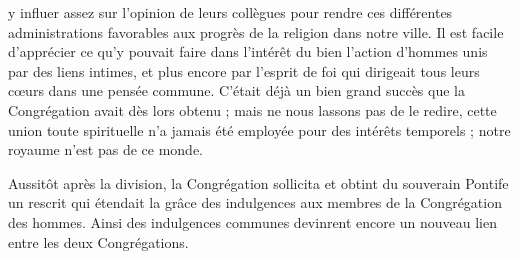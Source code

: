 y influer assez sur l'opinion de leurs collègues pour rendre ces différentes administrations favorables aux progrès de la religion dans notre ville. Il est facile d'apprécier ce qu'y pouvait faire dans l'intérêt du bien l'action d'hommes unis par des liens intimes, et plus encore par l'esprit de foi qui dirigeait tous leurs cœurs dans une pensée commune. C'était déjà un bien grand succès que la Congrégation avait dès lors obtenu ; mais ne nous lassons pas de le redire, cette union toute spirituelle n'a jamais été employée pour des intérêts temporels ; notre royaume n'est pas de ce monde.

Aussitôt après la division, la Congrégation sollicita et obtint du souverain Pontife un rescrit qui étendait la grâce des indulgences aux membres de la Congrégation des hommes. Ainsi des indulgences communes devinrent encore un nouveau lien entre les deux Congrégations.
